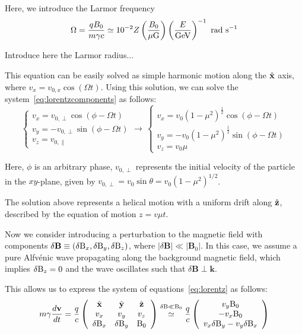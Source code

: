 Here, we introduce the Larmor frequency 
\begin{equation}
\Omega = \frac{q B_0}{m \gamma c} \simeq 10^{-2} Z \left(\frac{B_0}{\rm \mu G}\right) \left(\frac{E}{\rm GeV}\right)^{-1}~\text{rad}~\text{s}^{-1}
\end{equation}

{\color{red}Introduce here the Larmor radius...}

This equation can be easily solved as simple harmonic motion along the $\hat{\vb x}$ axis, where $v_{x} = v_{0,x} \cos (\Omega t)$. Using this solution, we can solve the system~\eqref{eq:lorentzcomponents} as follows:
%
\begin{equation}
\begin{cases}
v_x = v_{0,\perp} \cos (\phi - \Omega t) \\
v_y = - v_{0,\perp} \sin (\phi - \Omega t) \\
v_z = v_{0,\parallel}
\end{cases}
\rightarrow \, 
\begin{cases}
v_x = v_{0} (1 - \mu^2)^{\frac{1}{2}} \cos (\phi - \Omega t) \\
v_y = - v_{0} (1 - \mu^2)^{\frac{1}{2}} \sin (\phi - \Omega t) \\
v_z = v_{0} \mu
\end{cases}
\end{equation}

Here, $\phi$ is an arbitrary phase, $v_{0,\perp}$ represents the initial velocity of the particle in the $xy$-plane, given by $v_{0,\perp} = v_0 \sin \theta = v_0 (1-\mu^2)^{1/2}$.

The solution above represents a helical motion with a uniform drift along $\hat{\vb z}$, described by the equation of motion $z = v \mu t$.

Now we consider introducing a perturbation to the magnetic field with components $\delta \mathbf{B} \equiv (\delta {\rm B}_x, \delta {\rm B}_y, \delta {\rm B}_z)$, where $|\delta \mathbf{B}| \ll |\mathbf{B}_0|$. In this case, we assume a pure Alfvénic wave propagating along the background magnetic field, which implies $\delta {\rm B}_z = 0$ and the wave oscillates such that $\delta \mathbf{B} \perp \mathbf{k}$.

This allows us to express the system of equations~\eqref{eq:lorentz} as follows:
%
\begin{equation}
m \gamma \frac{d\vb v}{dt} = \frac{q}{c}
\left(
\begin{array}{ccc}
\hat {\vb x}  & \hat {\vb y}  & \hat {\vb z}  \\
v_x & v_y & v_z \\
\delta {\rm B}_x & \delta {\rm B}_y & {\rm B}_0 
\end{array}
\right)
\oset{\delta {\rm B} \ll {\rm B}_0} \simeq
\frac{q}{c}
\left(
\begin{array}{c}
v_y {\rm B}_0 \\
-v_x {\rm B}_0 \\
v_x \delta {\rm B}_y - v_y \delta {\rm B}_x
\end{array}
\right)
\end{equation}

